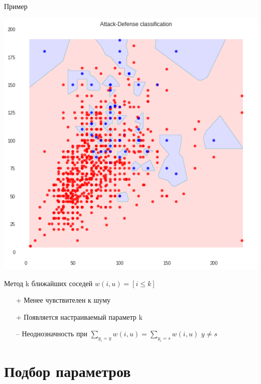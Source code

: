 \documentclass[10pt]{beamer}
\begin{document}
\begin{frame}{Пример}
  \begin{center}
    	\includegraphics[width=\linewidth,height=0.8\textheight,keepaspectratio]{images/attack_vs_defense_fail}  
  \end{center}
\end{frame}

\begin{frame}{Метод k ближайших соседей}
	\bigbreak
	${w(i, u) = [i \leq k]}$\\
	\bigbreak
	\begin{itemize} [<+- | alert@+>]
		\item[+] Менее чувствителен к шуму
		\item[+] Появляется настраиваемый параметр k
	  \bigbreak
	  \item[--] Неоднозначность при ${\sum\limits_{y_i = y} w(i, u) = \sum\limits_{y_i = s} w(i, u)}$ \hspace{5mm} $y \neq s$
	\end{itemize}
\end{frame}

\section{Подбор параметров}
\end{document}
